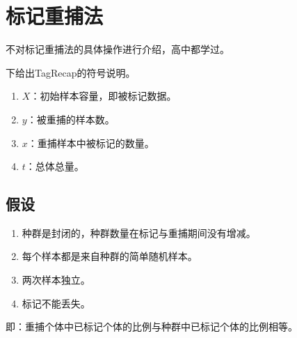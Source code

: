 \chapter{标记重捕法}
不对标记重捕法的具体操作进行介绍，高中都学过。\par
下给出\gls{TagRecap}的符号说明。
\begin{enumerate}
	\item $X$：初始样本容量，即被标记数据。
	\item $y$：被重捕的样本数。
	\item $x$：重捕样本中被标记的数量。
	\item $t$：总体总量。
\end{enumerate}
\section{假设}
\begin{enumerate}
	\item 种群是封闭的，种群数量在标记与重捕期间没有增减。 
	\item 每个样本都是来自种群的简单随机样本。
	\item 两次样本独立。
	\item 标记不能丢失。
\end{enumerate}
即：重捕个体中已标记个体的比例与种群中已标记个体的比例相等。

